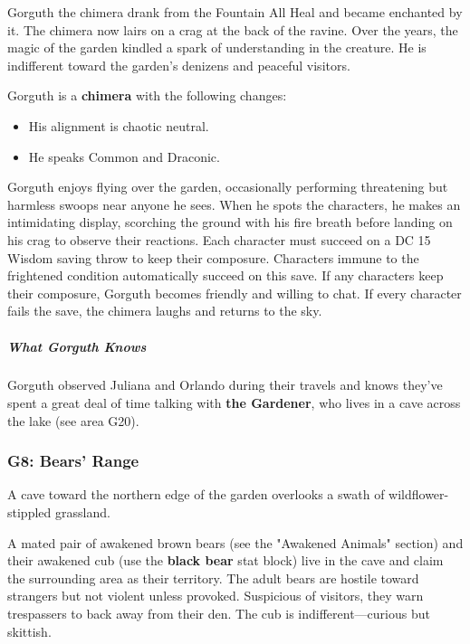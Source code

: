 \documentclass[10pt,a4paper,twoside,bg=print,twocolumn,openany,nodeprecatedcode]{dndbook}
\begin{document}
Gorguth the chimera drank from the Fountain All Heal and became enchanted by it. The chimera now lairs on a crag at the back of the ravine. Over the years, the magic of the garden kindled a spark of understanding in the creature. He is indifferent toward the garden's denizens and peaceful visitors.

Gorguth is a \textbf{chimera} with the following changes:


\begin{itemize}
\item His alignment is chaotic neutral.
\item He speaks Common and Draconic.
\end{itemize}

Gorguth enjoys flying over the garden, occasionally performing threatening but harmless swoops near anyone he sees. When he spots the characters, he makes an intimidating display, scorching the ground with his fire breath before landing on his crag to observe their reactions. Each character must succeed on a DC 15 Wisdom saving throw to keep their composure. Characters immune to the frightened condition automatically succeed on this save. If any characters keep their composure, Gorguth becomes friendly and willing to chat. If every character fails the save, the chimera laughs and returns to the sky.

\subparagraph{What Gorguth Knows}
Gorguth observed Juliana and Orlando during their travels and knows they've spent a great deal of time talking with \textbf{the Gardener}, who lives in a cave across the lake (see area G20).

\subsubsection{G8: Bears' Range}
\begin{DndReadAloud}{}
A cave toward the northern edge of the garden overlooks a swath of wildflower-stippled grassland.

\end{DndReadAloud}

A mated pair of awakened brown bears (see the "Awakened Animals" section) and their awakened cub (use the \textbf{black bear} stat block) live in the cave and claim the surrounding area as their territory. The adult bears are hostile toward strangers but not violent unless provoked. Suspicious of visitors, they warn trespassers to back away from their den. The cub is indifferent—curious but skittish.
\end{document}
